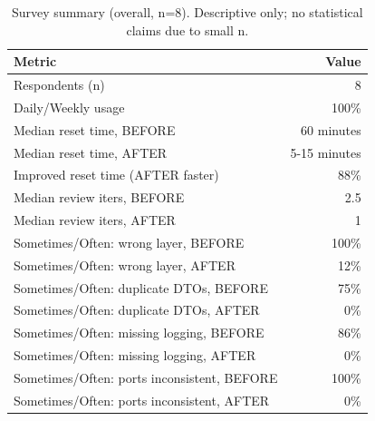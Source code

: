 \begin{table}[t]
\centering
\small
\caption{Survey summary (overall, n=8). Descriptive only; no statistical claims due to small n.}
\label{tab:survey-overall-v1}
\begin{tabular}{lr}
\toprule
Metric & Value \\
\midrule
Respondents (n) & 8 \\
Daily/Weekly usage & 100\% \\
Median reset time, BEFORE & 60 minutes \\
Median reset time, AFTER & 5-15 minutes \\
Improved reset time (AFTER faster) & 88\% \\
Median review iters, BEFORE & 2.5 \\
Median review iters, AFTER & 1 \\
Sometimes/Often: wrong layer, BEFORE & 100\% \\
Sometimes/Often: wrong layer, AFTER & 12\% \\
Sometimes/Often: duplicate DTOs, BEFORE & 75\% \\
Sometimes/Often: duplicate DTOs, AFTER & 0\% \\
Sometimes/Often: missing logging, BEFORE & 86\% \\
Sometimes/Often: missing logging, AFTER & 0\% \\
Sometimes/Often: ports inconsistent, BEFORE & 100\% \\
Sometimes/Often: ports inconsistent, AFTER & 0\% \\
\bottomrule
\end{tabular}
\end{table}
